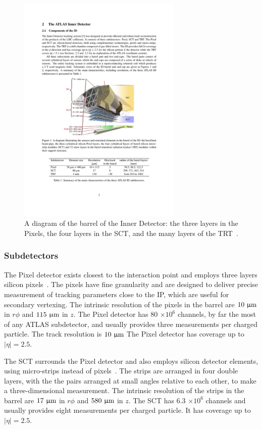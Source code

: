 \begin{figure}[tp]
  \centering
  \includegraphics[width=0.7\textwidth]{figures/lhc-atlas/detector-ID}
  \caption{A diagram of the barrel of the Inner Detector: the three layers in the Pixels, the four layers in the SCT, and the many layers of the TRT~\cite{ATLAS-CONF-2014-047}.}
  \label{fig:atlas-detector-id}
\end{figure}

\subsubsection{Subdetectors}

The Pixel detector exists closest to the interaction point and employs three layers silicon pixels~\cite{cern-jinst-atlas}. The pixels have fine granularity and are designed to deliver precise measurement of tracking parameters close to the IP, which are useful for secondary vertexing. The intrinsic resolution of the pixels in the barrel are $10\ \upmu\text{m}$ in $r\phi$ and $115\ \upmu\text{m}$ in $z$. The Pixel detector has 80 $\times 10^{6}$ channels, by far the most of any ATLAS subdetector, and usually provides three measurements per charged particle. The track resolution is $10\ \upmu\text{m}$ The Pixel detector has coverage up to $|\eta|=2.5$.

The SCT surrounds the Pixel detector and also employs silicon detector elements, using micro-strips instead of pixels~\cite{cern-jinst-atlas}. The strips are arranged in four double layers, with the the pairs arranged at small angles relative to each other, to make a three-dimensional measurement. The intrinsic resolution of the strips in the barrel are $17\ \upmu\text{m}$ in $r\phi$ and $580\ \upmu\text{m}$ in $z$. The SCT has 6.3 $\times 10^{6}$ channels and usually provides eight measurements per charged particle. It has coverage up to $|\eta|=2.5$.


